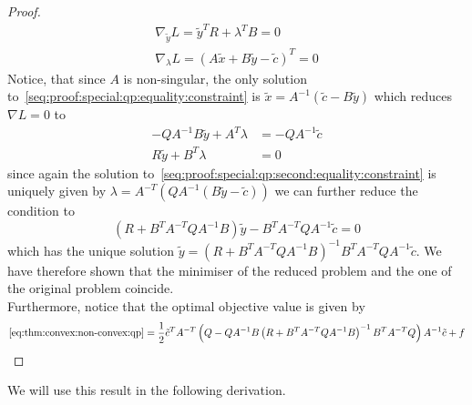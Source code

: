 \begin{proof}
\begin{align}
	\nabla_{\tilde y} L = \tilde y^TR+\lambda^T B = 0\\
	\nabla_\lambda L = (A\tilde x+B\tilde y - \tilde c)^T = 0 \label{seq:proof:special:qp:equality:constraint}
\end{align}
%
Notice, that since $A$ is non-singular, the only solution to~\eqref{seq:proof:special:qp:equality:constraint} is $\tilde x=A^{-1}(\tilde c-B\tilde y)$ which reduces $\nabla L = 0$ to
%
\begin{align}
	-QA^{-1}B\tilde y + A^{T}\lambda &=  -QA^{-1}\tilde c\label{seq:proof:special:qp:second:equality:constraint}\\
	R\tilde y + B^T\lambda &= 0
\end{align}
%
since again the solution to~\eqref{seq:proof:special:qp:second:equality:constraint} is uniquely given by $\lambda = A^{-T}\left(Q A^{-1}(B\tilde y-\tilde c)\right)$ we can further reduce the condition to
%
\begin{equation}
	\left(R + B^TA^{-T}QA^{-1}B\right)\tilde y-B^TA^{-T}QA^{-1}\tilde c = 0
\end{equation}
%
which has the unique solution $\tilde y = \left(R + B^TA^{-T}QA^{-1}B\right)^{-1}B^TA^{-T}QA^{-1}\tilde c$.
%
We have therefore shown that the minimiser of the reduced problem and the one of the original problem coincide.
%
\\[1em]
%
Furthermore, notice that the optimal objective value is given by
%
\begin{equation}
	\eqref{eq:thm:convex:non-convex:qp} = \frac{1}{2} \tilde c^TA^{-T}\left(Q- QA^{-1}B\left(R + B^TA^{-T}QA^{-1}B\right)^{-1}B^TA^{-T}Q\right)A^{-1}\tilde c + f
\end{equation}
%

\end{proof}
%
%
\noindent We will use this result in the following derivation.
%
\\[1em]
%
